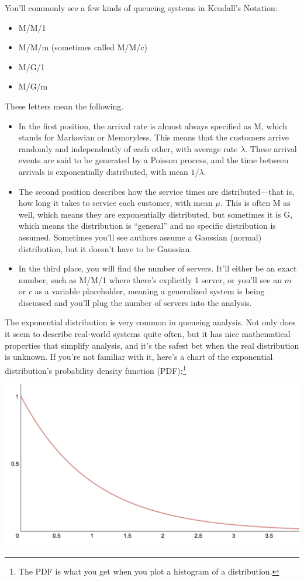 \documentclass{vivid_layout}
\begin{document}
You'll commonly see a few kinds of queueing systems in Kendall's Notation:

\begin{itemize}
\item M/M/1
\item M/M/m (sometimes called M/M/c)
\item M/G/1
\item M/G/m
\end{itemize}

These letters mean the following.

\begin{itemize}
\item In the first position, the arrival rate is almost always specified as M, which stands for Markovian or Memoryless. This means that the customers arrive randomly and independently of each other, with average rate \( \lambda \). These arrival events are said to be generated by a Poisson process, and the time between arrivals is exponentially distributed, with mean \( 1/\lambda \).
\item The second position describes how the service times are distributed---that is, how long it takes to service each customer, with mean \( \mu \). This is often M as well, which means they are exponentially distributed, but sometimes it is G, which means the distribution is ``general'' and no specific distribution is assumed. Sometimes you'll see authors assume a Gaussian (normal) distribution, but it doesn't have to be Gaussian.
\item In the third place, you will find the number of servers. It'll either be an exact number, such as M/M/1 where there's explicitly 1 server, or you'll see an $m$ or $c$ as a variable placeholder, meaning a generalized system is being discussed and you'll plug the number of servers into the analysis.
\end{itemize}

The exponential distribution is very common in queueing analysis. Not only does it seem to describe real-world systems quite often, but it has nice mathematical properties that simplify analysis, and it's the safest bet when the real distribution is unknown. If you're not familiar with it, here's a chart of the exponential distribution's probability density function (PDF):\footnote{The PDF is what you get when you plot a histogram of a distribution.}

\begin{center}
\includegraphics[width=.75\linewidth]{queueing-theory/exp}
\end{center}
\end{document}
